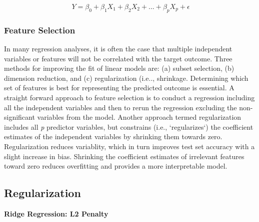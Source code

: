 \documentclass[sigconf]{acmart}
\begin{document}
\begin{equation}
  \ Y = \beta_0 + \beta_1X_1 + \beta_2X_2 +... + \beta_pX_p + \epsilon
\end{equation}


\subsubsection{Feature Selection} 

In many regression analyses, it is often the case that multiple independent 
variables or features will not be correlated with the target outcome. Three 
methods for improving the fit of linear models are: (a) subset selection, 
(b) dimension reduction, and (c) regularization (i.e.., shrinkage. Determining 
which set of features is best for representing the predicted outcome is 
essential. A straight forward approach to feature selection is to conduct a 
regression including all the independent variables and then to rerun the 
regression excluding the non-significant variables from the model.
Another approach termed regularization includes all \textit{p} predictor 
variables, but constrains (i.e., `regularizes`) the coefficient estimates of 
the independent variables by shrinking them towards zero. Regularization 
reduces variablity, which in turn improves test set accuracy with a slight 
increase in bias. Shrinking the coefficient estimates of irrelevant features 
toward zero reduces overfitting and provides a more interpretable model. 


\subsection{Regularization} 

\textbf{Ridge Regression: L2 Penalty} 
\end{document}
